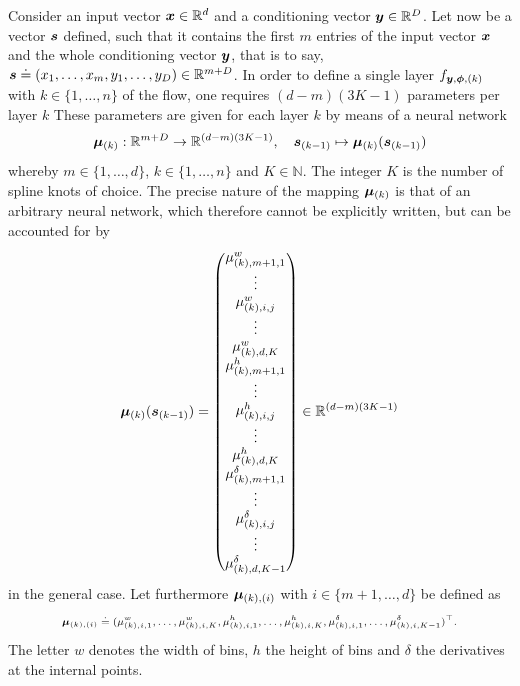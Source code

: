 \documentclass[a4paper,11pt]{report}
\begin{document}
Consider an input vector $\bm{x} \in \mathbb{R}^d$ and a conditioning vector $\bm{y} \in \mathbb{R}^D$. Let now be a vector $\bm{s}$ defined, such that it contains the first $m$ entries of the input vector $\bm{x}$ and the whole conditioning vector $\bm{y}$, that is to say, $\bm{s} \doteq (x_1,\dots,x_m,y_1,\dots,y_D) \in \mathbb{R}^{m+D}$. In order to define a single layer $f_{\bm{y},\bm{\phi},(k)}$ with $k \in \{1,\dots,n\}$ of the flow, one requires $(d-m)(3K-1)$ parameters per layer $k$ These parameters are given for each layer $k$ by means of a neural network \begin{equation}
\bm{\mu}_{(k)}: \mathbb{R}^{m+D}\rightarrow \mathbb{R}^{(d-m)(3K-1)}, \quad \bm{s}_{(k-1)} \mapsto \bm{\mu}_{(k)}(\bm{s}_{(k-1)})
\end{equation} whereby $m \in \{1,\dots,d\}$, $k \in \{1,\dots,n\}$ and $K \in \mathbb{N}$. The integer $K$ is the number of spline knots of choice. The precise nature of the mapping $\bm{\mu}_{(k)}$ is that of an arbitrary neural network, which therefore cannot be explicitly written, but can be accounted for by
\begin{align}
\begin{aligned}
\bm{\mu}_{(k)}(\bm{s}_{(k-1)}) = \begin{pmatrix}
\mu_{(k),m+1,1}^w \\
\vdots \\
\mu_{(k),i,j}^w \\
\vdots \\
\mu_{(k),d,K}^w \\
\mu_{(k),m+1,1}^h \\
\vdots \\
\mu_{(k),i,j}^h \\
\vdots \\
\mu_{(k),d,K}^h \\
\mu_{(k),m+1,1}^\delta \\
\vdots \\
\mu_{(k),i,j}^\delta \\
\vdots \\
\mu_{(k),d,K-1}^\delta \\
\end{pmatrix} \in \mathbb{R}^{(d-m)(3K-1)}
\end{aligned}
\end{align}
in the general case. Let furthermore $\bm{\mu}_{(k),(i)}$ with $i \in \{m+1,\dots,d\}$ be defined as \begin{align}\scriptsize\begin{aligned}
\bm{\mu}_{(k),(i)} \doteq (\mu_{(k),i,1}^w,\dots,\mu_{(k),i,K}^w, \mu_{(k),i,1}^h, \dots, \mu_{(k),i,K}^h, \mu_{(k),i,1}^\delta, \dots,\mu_{(k),i,K-1}^\delta)^\top.
\end{aligned}\end{align} The letter $w$ denotes the width of bins, $h$ the height of bins and $\delta$ the derivatives at the internal points.
\end{document}
